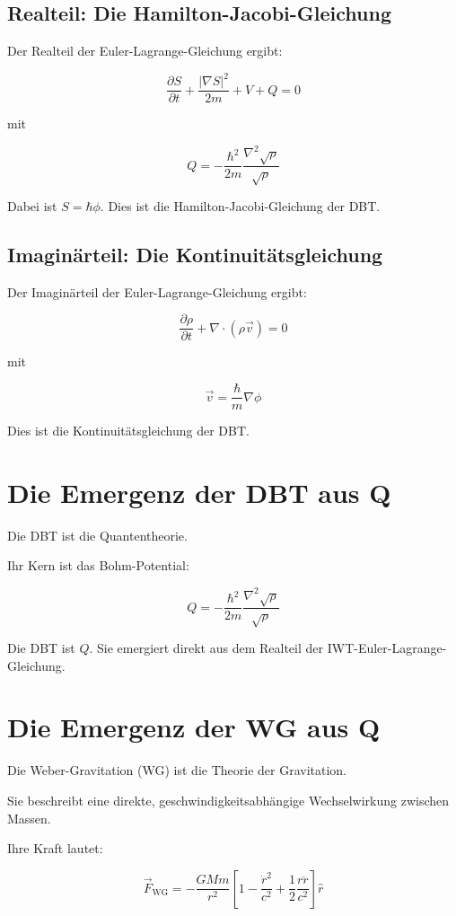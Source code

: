 \subsection{Realteil: Die Hamilton-Jacobi-Gleichung}

Der Realteil der Euler-Lagrange-Gleichung ergibt:

\[
\frac{\partial S}{\partial t} + \frac{|\nabla S|^2}{2m} + V + Q = 0
\]

mit

\[
Q = -\frac{\hbar^2}{2m} \frac{\nabla^2 \sqrt{\rho}}{\sqrt{\rho}}
\]

Dabei ist \( S = \hbar \phi \). Dies ist die Hamilton-Jacobi-Gleichung der DBT.

\subsection{Imaginärteil: Die Kontinuitätsgleichung}

Der Imaginärteil der Euler-Lagrange-Gleichung ergibt:

\[
\frac{\partial \rho}{\partial t} + \nabla \cdot (\rho \vec{v}) = 0
\]

mit

\[
\vec{v} = \frac{\hbar}{m} \nabla \phi
\]

Dies ist die Kontinuitätsgleichung der DBT.

\section{Die Emergenz der DBT aus Q}

Die DBT ist die Quantentheorie.

Ihr Kern ist das Bohm-Potential:

\[
Q = -\frac{\hbar^2}{2m} \frac{\nabla^2 \sqrt{\rho}}{\sqrt{\rho}}
\]

Die DBT ist \( Q \). Sie emergiert direkt aus dem Realteil der IWT-Euler-Lagrange-Gleichung.

\section{Die Emergenz der WG aus Q}

Die Weber-Gravitation (WG) ist die Theorie der Gravitation.

Sie beschreibt eine direkte, geschwindigkeitsabhängige Wechselwirkung zwischen Massen.

Ihre Kraft lautet:

\[
\vec{F}_{\text{WG}} = -\frac{GMm}{r^2} \left[ 1 - \frac{\dot{r}^2}{c^2} + \frac{1}{2} \frac{r\ddot{r}}{c^2} \right] \hat{r}
\]

